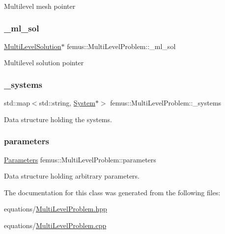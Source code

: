 Multilevel mesh pointer \mbox{\label{classfemus_1_1_multi_level_problem_a6dd8fec26a0ffbaae07e6df7ea42d12b}} 
\subsubsection{\texorpdfstring{\+\_\+ml\+\_\+sol}{\_ml\_sol}}
{\footnotesize\ttfamily \mbox{\hyperlink{classfemus_1_1_multi_level_solution}{Multi\+Level\+Solution}}$\ast$ femus\+::\+Multi\+Level\+Problem\+::\+\_\+ml\+\_\+sol}

Multilevel solution pointer \mbox{\label{classfemus_1_1_multi_level_problem_af74d8678115d5a61bc0b4929fc74d50d}} 
\subsubsection{\texorpdfstring{\+\_\+systems}{\_systems}}
{\footnotesize\ttfamily std\+::map$<$std\+::string, \mbox{\hyperlink{classfemus_1_1_system}{System}}$\ast$$>$ femus\+::\+Multi\+Level\+Problem\+::\+\_\+systems}

Data structure holding the systems. \mbox{\label{classfemus_1_1_multi_level_problem_a537b31965e5402b9c9febebce96ce01c}} 
\subsubsection{\texorpdfstring{parameters}{parameters}}
{\footnotesize\ttfamily \mbox{\hyperlink{classfemus_1_1_parameters}{Parameters}} femus\+::\+Multi\+Level\+Problem\+::parameters}

Data structure holding arbitrary parameters. 

The documentation for this class was generated from the following files\+:\begin{DoxyCompactItemize}
\item 
equations/\mbox{\hyperlink{_multi_level_problem_8hpp}{Multi\+Level\+Problem.\+hpp}}\item 
equations/\mbox{\hyperlink{_multi_level_problem_8cpp}{Multi\+Level\+Problem.\+cpp}}\end{DoxyCompactItemize}
